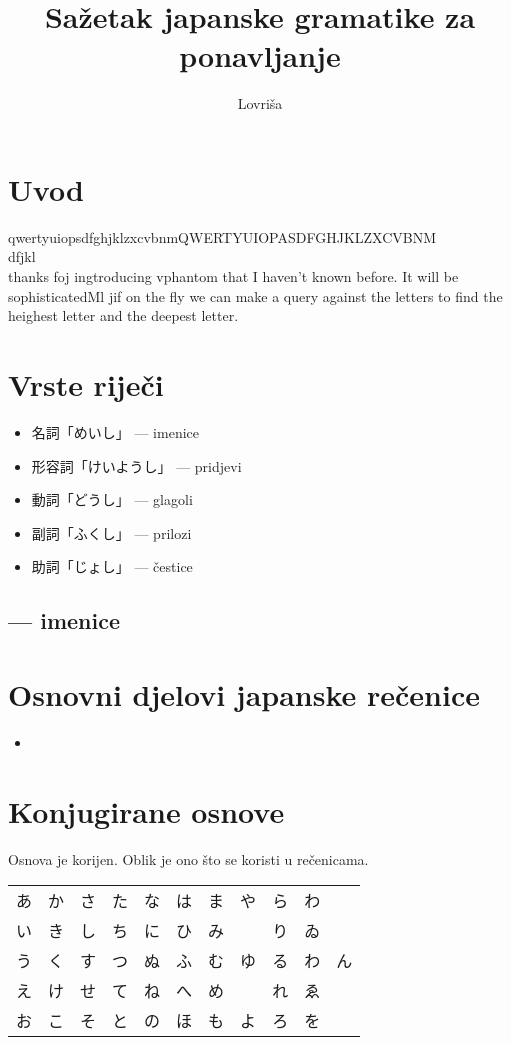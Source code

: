 \documentclass[a4paper, 12pt]{amsart}
\title{Sažetak japanske gramatike za ponavljanje}
\author{Lovriša}
\newcommand{\f}[2]{\ruby{#1}{\smash{\sffamily{#2}}}\CJKglue}
\begin{document}
	\maketitle
	
	\section{Uvod}
	qwertyuiopsdfghjklzxcvbnmQWERTYUIOPASDFGHJKLZXCVBNM \\
	dfjkl \\
	thanks foj ingtroducing vphantom that I haven't known before. It will be sophisticatedMl\f{未}{み}\f{然}{ぜん}\f{形}{けい} jif on the fly we can make a query against the letters to find the heighest letter and the deepest letter. 
	
	\section{Vrste riječi}
	\begin{itemize}
		\item 名詞「めいし」 --- imenice
		\item 形容詞「けいようし」 --- pridjevi
		\item 動詞「どうし」 --- glagoli
		\item 副詞「ふくし」 --- prilozi
		\item 助詞「じょし」 --- čestice
	\end{itemize}
  \subsection{\f{名}{めい}\f{詞}{し} --- imenice}

  \section{Osnovni djelovi japanske rečenice}
  \begin{itemize}
  	\item 
  \end{itemize}

  \section{Konjugirane osnove}
  Osnova je korijen.
  Oblik je ono što se koristi u rečenicama.
 
  
  \begin{center}
  	\begin{tabular}{ccccccccccc}
  		あ & か & さ & た & な & は & ま & や & ら & わ & \\
  		い & き & し & ち & に & ひ & み &   & り & ゐ & \\
  		う & く & す & つ & ぬ & ふ & む & ゆ & る & わ & ん \\
  		え & け & せ & て & ね & へ & め &   & れ & ゑ & \\ 
  		お & こ & そ & と & の & ほ & も & よ & ろ & を &  \\
  	\end{tabular}
  \end{center}
\end{document}
